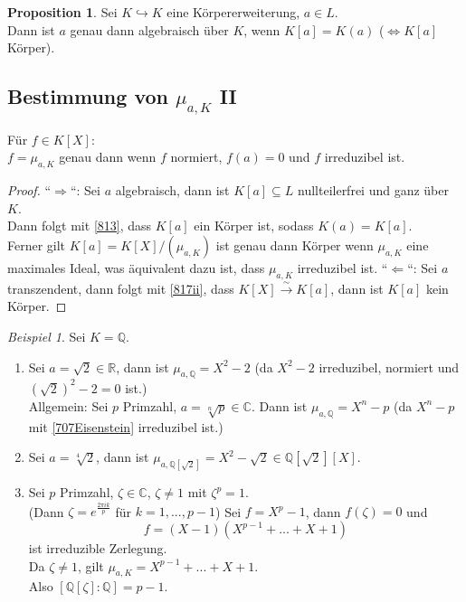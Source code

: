 \documentclass[10pt,a4paper]{article}
\newcommand{\Q}{\ensuremath{\mathbb{Q}}}
\newcommand{\R}{\ensuremath{\mathbb{R}}}
\newcommand{\C}{\ensuremath{\mathbb{C}}}
\newcommand{\isomfunc}{\ensuremath{\xrightarrow{\sim}}}
\newcounter{thm}[section]
\theoremstyle{definition}
\newtheorem{prop}[thm]{Proposition}
\theoremstyle{plain}
\theoremstyle{remark}
\newtheorem{exm}[thm]{Beispiel}
\begin{document}
\begin{prop}\label{819Prop}
	Sei $K\hookrightarrow K$ eine Körpererweiterung, $a\in L$.\\
	Dann ist $a$ genau dann algebraisch über $K$, wenn $K[a]=K(a)$ ($\Leftrightarrow K[a]$ Körper).
\end{prop}

\subsection*{Bestimmung von $\mu_{a,K}$ II} Für $f\in K[X]$:\\
$f=\mu_{a,K}$ genau dann wenn $f$ normiert, $f(a)=0$ und $f$ irreduzibel ist.
\begin{proof}
	``$\Rightarrow$``: Sei $a$ algebraisch, dann ist $K[a]\subseteq L$ nullteilerfrei und ganz über $K$.\\
	Dann folgt mit \ref{813}, dass $K[a]$ ein Körper ist, sodass $K(a)=K[a]$.\\
	Ferner gilt $K[a]=K[X]/(\mu_{a,K})$ ist genau dann Körper wenn $\mu_{a,K}$ eine maximales Ideal, 
	was äquivalent dazu ist, dass $\mu_{a,K}$ irreduzibel ist.
	``$\Leftarrow$``: Sei $a$ transzendent, dann folgt mit \ref{817ii}, dass $K[X]\isomfunc K[a]$, dann ist $K[a]$ kein Körper.
\end{proof}


\begin{exm}
	Sei $K=\Q$.\begin{enumerate}
		\item Sei $a=\sqrt 2\in \R$, dann ist $\mu_{a,\Q}=X^2-2$ (da $X^2-2$ irreduzibel, normiert und $(\sqrt{ 2})^2-2=0$ ist.)\\
		Allgemein: Sei $p$ Primzahl, $a=\sqrt[n]{p}\in\C$. Dann ist $\mu_{a,\Q}=X^n-p$ (da $X^n-p$ mit \ref{707Eisenstein} irreduzibel ist.)
		\item Sei $a=\sqrt[4]{2}$, dann ist $\mu_{a,\Q[\sqrt{2}]}=X^2-\sqrt{2}\in \Q[\sqrt{2}][X]$.
		\item Sei $p$ Primzahl, $\zeta\in\C$, $\zeta\neq 1$ mit $\zeta^p=1$.\\
		(Dann $\zeta=e^{\frac{2\pi i k}{p}}$ für $k=1,...,p-1$)
		Sei $f=X^p-1$, dann $f(\zeta)=0$ und
		\[f=(X-1)(X^{p-1}+...+X+1)\]
		ist irreduzible Zerlegung.\\
		Da $\zeta\neq 1$, gilt $\mu_{a,K}=X^{p-1}+...+X+1$.\\
		Also $[\Q[\zeta]:\Q]=p-1$.
	\end{enumerate}
\end{exm}
\end{document}
